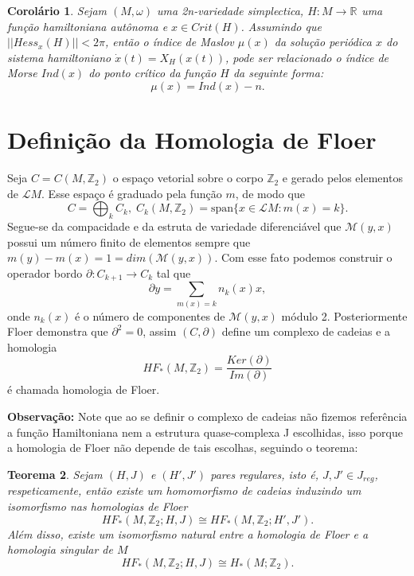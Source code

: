 \documentclass[12pt]{book}
\newtheorem{teorema}{Teorema}[section]
\newtheorem{corolario}[teorema]{Corolário}
\newcommand{\real}[1]{\mathbb{R}^{#1}}
\newcommand{\solucoesperiodicascontrateis}{\mathcal{L}M}
\begin{document}
	\begin{corolario}
		Sejam $(M, \omega)$ uma 2n-variedade simplectica, $H : M \to \real{}$ uma função hamiltoniana autônoma e $x \in Crit(H)$. Assumindo que $||Hess_{x}(H)|| < 2\pi$, então o índice de Maslov $\mu(x)$ da solução periódica $x$ do sistema hamiltoniano $\dot{x}(t) = X_{H}(x(t))$, pode ser relacionado o índice de Morse $Ind(x)$ do ponto crítico da função $H$ da seguinte forma:
		$$
		\mu(x) = Ind(x) - n.
		$$
	\end{corolario}	
	
	\section{Definição da Homologia de Floer}
	Seja $C = C(M, \mathbb{Z}_{2})$ o espaço vetorial sobre o corpo $\mathbb{Z}_{2}$ e gerado pelos elementos de $\solucoesperiodicascontrateis$. Esse espaço é graduado pela função $m$, de modo que
	$$
	C = \bigoplus_{k}C_{k}, \; C_{k}(M, \mathbb{Z}_{2}) = \text{span}\{x \in \solucoesperiodicascontrateis:m(x)=k \}.
	$$
	Segue-se da compacidade e da estruta de variedade diferenciável que $\mathcal{M}(y,x)$ possui um número finito de elementos sempre que $ m(y)-m(x)=1 = dim(\mathcal{M}(y,x))$. Com esse fato podemos construir o operador bordo $\partial : C_{k+1} \to C_{k}$ tal que
	$$
	\partial y = \sum_{m(x)=k} n_{k}(x) x,	
	$$
	onde $n_{k}(x)$ é o número de componentes de $\mathcal{M}(y,x)$ módulo 2. Posteriormente Floer demonstra que $\partial^{2}=0$, assim $(C,\partial)$ define um complexo de cadeias e a homologia
	$$
	HF_{*}(M, \mathbb{Z}_{2}) = \frac{Ker(\partial)}{Im(\partial)}
	$$
	é chamada homologia de Floer.
	
	\textbf{Observação:} Note que ao se definir o complexo de cadeias não fizemos referência a função Hamiltoniana nem a estrutura quase-complexa J escolhidas, isso porque a homologia de Floer não depende de tais escolhas, seguindo o teorema:
	
	\begin{teorema}
		Sejam $(H,J)$ e $(H',J')$ pares regulares, isto é, $J, J' \in J_{reg}$, respeticamente, então existe um homomorfismo de cadeias induzindo um isomorfismo nas homologias de Floer
		$$
		HF_{*}(M,\mathbb{Z}_{2};H,J) \cong HF_{*}(M,\mathbb{Z}_{2};H',J'). 
		$$
		Além disso, existe um isomorfismo natural entre a homologia de Floer e a homologia singular de $M$
		$$
		HF_{*}(M,\mathbb{Z}_{2};H,J) \cong H_{*}(M;\mathbb{Z}_{2}). 
		$$
		
	\end{teorema}
	
\end{document}
